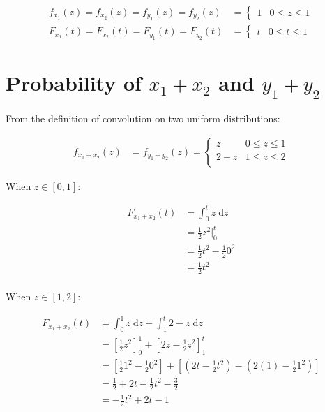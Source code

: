 \documentclass{article}
\newcommand{\dz}{{\; \mathrm{d}z}}
\begin{document}
\begin{align*}
f_{x_1}(z) = f_{x_2}(z) = f_{y_1}(z) = f_{y_2}(z) &=
\begin{cases}
    1 & 0 \leq z \leq 1
\end{cases}
\\
F_{x_1}(t) = F_{x_2}(t) = F_{y_1}(t) = F_{y_2}(t) &=
\begin{cases}
    t & 0 \leq t \leq 1
\end{cases}
\end{align*}

\section{Probability of $x_1 + x_2$ and $y_1 + y_2$}

From the definition of convolution on two uniform distributions:

\begin{align*}
f_{x_1 + x_2}(z) &= f_{y_1 + y_2}(z) =
\begin{cases}
    z     & 0 \leq z \leq 1 \\
    2 - z & 1 \leq z \leq 2 \\
\end{cases}
\end{align*}

When $z \in [0, 1]$:

\begin{align*}
F_{x_1 + x_2}(t)
&= \int_{0}^{t} z \dz \\
&= \frac{1}{2}z^2 \Big|_{0}^{t} \\
&= \frac{1}{2}t^2 - \frac{1}{2}0^2 \\
&= \frac{1}{2}t^2 \\
\end{align*}

When $z \in [1, 2]$:

\begin{align*}
F_{x_1 + x_2}(t)
&= \int_{0}^{1} z \dz + \int_{1}^{t} 2 - z \dz \\
&= \left[ \frac{1}{2}z^2 \right]_{0}^{1} + \left[ 2z - \frac{1}{2}z^2 \right]_{1}^{t} \\
&= \left[ \frac{1}{2}1^2 - \frac{1}{2}0^2 \right] + \left[ \left( 2t - \frac{1}{2}t^2 \right) - \left( 2(1) - \frac{1}{2}1^2 \right) \right] \\
&= \frac{1}{2} + 2t - \frac{1}{2}t^2 - \frac{3}{2} \\
&= -\frac{1}{2}t^2 + 2t - 1 \\
\end{align*}
\end{document}

